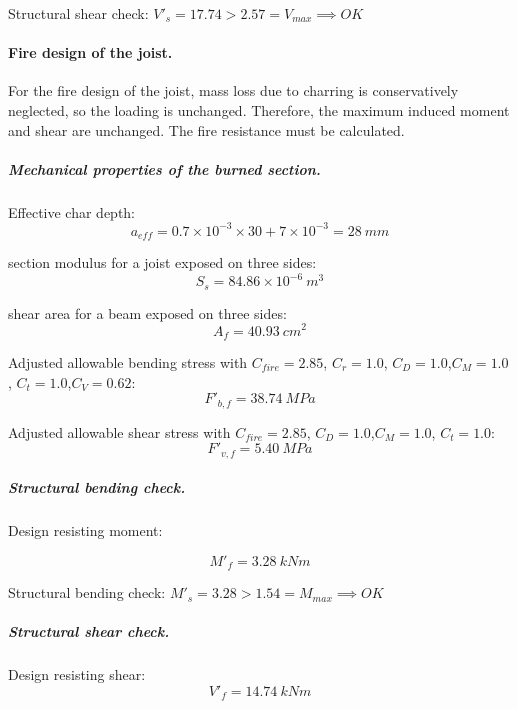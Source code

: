 \noindent Structural shear check: $V'_s = 17.74 > 2.57 = V_{max} \implies OK$

\paragraph{Fire design of the joist.}
For the fire design of the joist, mass loss due to charring is conservatively neglected, so the loading is unchanged. Therefore, the maximum induced moment and shear are unchanged. The fire resistance must be calculated.

\subparagraph{Mechanical properties of the burned section.}

\noindent Effective char depth:
\begin{equation}
  a_{eff}= 0.7 \times 10^{-3} \times 30 + 7 \times 10^{-3}= 28\ mm
\end{equation}

\noindent section modulus for a joist exposed on three sides:
\begin{equation}
  S_s= 84.86 \times 10^{-6}\ m^3
\end{equation}

\noindent shear area for a beam exposed on three sides:
\begin{equation}
  A_f= 40.93\ cm^2
\end{equation}

\noindent Adjusted allowable bending stress with $C_{fire}= 2.85$, $C_r= 1.0$, $C_D= 1.0$,$C_M= 1.0$, $C_t= 1.0$,$C_V= 0.62$:
\begin{equation}
  F'_{b,f}= 38.74\ MPa
\end{equation}

\noindent Adjusted allowable shear stress with  $C_{fire}= 2.85$, $C_D= 1.0$,$C_M= 1.0$, $C_t= 1.0$:
\begin{equation}
  F'_{v,f}= 5.40\ MPa
\end{equation}

\subparagraph{Structural bending check.}

\noindent Design resisting moment:

\begin{equation}
  M'_f= 3.28\ kN m
\end{equation}

\noindent Structural bending check: $M'_s = 3.28 > 1.54 = M_{max} \implies OK$

\subparagraph{Structural shear check.}

\noindent Design resisting shear:
\begin{equation}
  V'_f= 14.74\ kN m
\end{equation}

